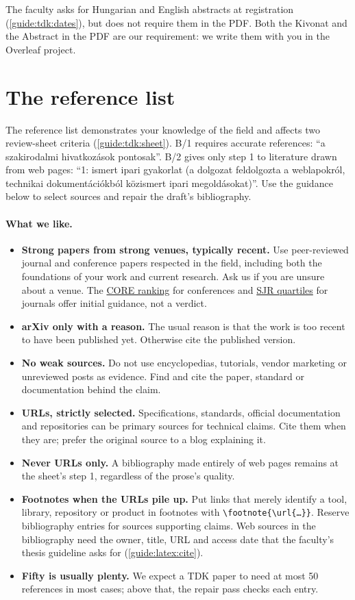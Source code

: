 The faculty asks for Hungarian and English abstracts at registration (\cref{guide:tdk:dates}), but does not require them in the PDF. Both the Kivonat and the Abstract in the PDF are our requirement: we write them with you in the Overleaf project.

\section{The reference list}\label{guide:writing:refs}
The reference list demonstrates your knowledge of the field and affects two review-sheet criteria (\cref{guide:tdk:sheet}). B/1 requires accurate references: \enquote{a szakirodalmi hivatkozások pontosak}. B/2 gives only step 1 to literature drawn from web pages: \enquote{1: ismert ipari gyakorlat (a dolgozat feldolgozta a weblapokról, technikai dokumentációkból közismert ipari megoldásokat)}. Use the guidance below to select sources and repair the draft's bibliography.

\paragraph{What we like.}
\begin{itemize}
  \item \textbf{Strong papers from strong venues, typically recent.} Use peer-reviewed journal and conference papers respected in the field, including both the foundations of your work and current research. Ask us if you are unsure about a venue. The \href{https://portal.core.edu.au/conf-ranks/}{CORE ranking} for conferences and \href{https://www.scimagojr.com/}{SJR quartiles} for journals offer initial guidance, not a verdict.
  \item \textbf{arXiv only with a reason.} The usual reason is that the work is too recent to have been published yet. Otherwise cite the published version.
  \item \textbf{No weak sources.} Do not use encyclopedias, tutorials, vendor marketing or unreviewed posts as evidence. Find and cite the paper, standard or documentation behind the claim.
  \item \textbf{URLs, strictly selected.} Specifications, standards, official documentation and repositories can be primary sources for technical claims. Cite them when they are; prefer the original source to a blog explaining it.
  \item \textbf{Never URLs only.} A bibliography made entirely of web pages remains at the sheet's step 1, regardless of the prose's quality.
  \item \textbf{Footnotes when the URLs pile up.} Put links that merely identify a tool, library, repository or product in footnotes with \texttt{\textbackslash footnote\{\textbackslash url\{\dots\}\}}. Reserve bibliography entries for sources supporting claims. Web sources in the bibliography need the owner, title, URL and access date that the faculty's thesis guideline asks for (\cref{guide:latex:cite}).
  \item \textbf{Fifty is usually plenty.} We expect a TDK paper to need at most 50 references in most cases; above that, the repair pass checks each entry.
\end{itemize}

